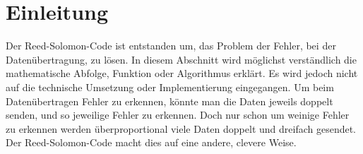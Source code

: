 %
%
%
\section{Einleitung
\label{reedsolomon:section:einleitung}}
Der Reed-Solomon-Code ist entstanden um,
das Problem der Fehler, bei der Datenübertragung, zu lösen.
In diesem Abschnitt wird möglichst verständlich die mathematische Abfolge, Funktion oder Algorithmus erklärt.
Es wird jedoch nicht auf die technische Umsetzung oder Implementierung eingegangen.
Um beim Datenübertragen Fehler zu erkennen, könnte man die Daten jeweils doppelt senden,
und so jeweilige Fehler zu erkennen.
Doch nur schon um weinige Fehler zu erkennen werden überproportional viele Daten doppelt und dreifach gesendet.
Der Reed-Solomon-Code macht dies auf eine andere, clevere Weise.



